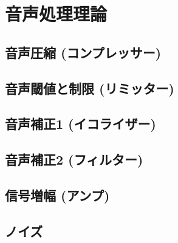 \chapter{音声処理理論}


\section{音声圧縮 (コンプレッサー)}

\section{音声閾値と制限 (リミッター)}

\section{音声補正1 (イコライザー)}

\section{音声補正2 (フィルター)}

\section{信号増幅 (アンプ)}

\section{ノイズ}
